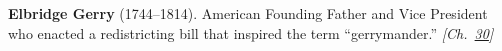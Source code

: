 \textbf{Elbridge Gerry} (1744–1814). American Founding Father and Vice President who enacted a redistricting bill that inspired the term ``gerrymander.'' \emph{[Ch.~\hyperref[ch:simpsonsparadox]{30}]}


